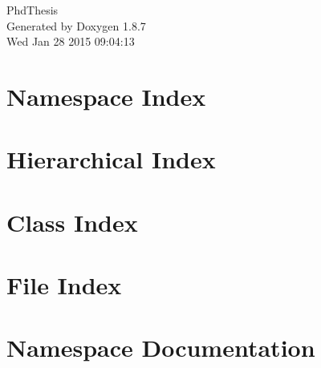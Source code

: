 \documentclass[twoside]{book}
\newcommand{\+}{\discretionary{\mbox{\scriptsize$\hookleftarrow$}}{}{}}
\newcommand{\clearemptydoublepage}{%
  \newpage{\pagestyle{empty}\cleardoublepage}%
}
\begin{document}
\hypersetup{pageanchor=false,
             bookmarks=true,
             bookmarksnumbered=true,
             pdfencoding=unicode
            }
\begin{titlepage}
\vspace*{7cm}
\begin{center}%
{\Large Phd\+Thesis }\\
\vspace*{1cm}
{\large Generated by Doxygen 1.8.7}\\
\vspace*{0.5cm}
{\small Wed Jan 28 2015 09:04:13}\\
\end{center}
\end{titlepage}
\clearemptydoublepage
\tableofcontents
\clearemptydoublepage
{}
\hypersetup{pageanchor=true}

\chapter{Namespace Index}

\chapter{Hierarchical Index}

\chapter{Class Index}

\chapter{File Index}

\chapter{Namespace Documentation}

\end{document}
